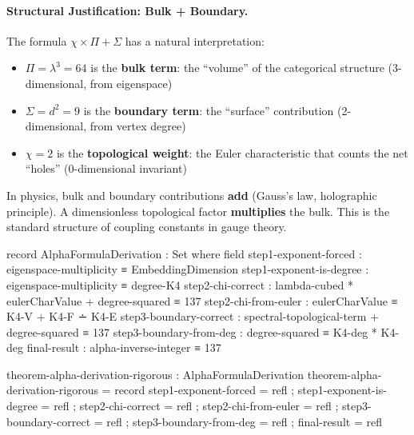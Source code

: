\documentclass[11pt,a4paper]{book}
\begin{document}

\paragraph{Structural Justification: Bulk + Boundary.}

The formula $\chi \times \Pi + \Sigma$ has a natural interpretation:

\begin{itemize}
\item $\Pi = \lambda^3 = 64$ is the \textbf{bulk term}: the ``volume'' of 
      the categorical structure (3-dimensional, from eigenspace)
\item $\Sigma = d^2 = 9$ is the \textbf{boundary term}: the ``surface'' 
      contribution (2-dimensional, from vertex degree)
\item $\chi = 2$ is the \textbf{topological weight}: the Euler characteristic 
      that counts the net ``holes'' (0-dimensional invariant)
\end{itemize}

In physics, bulk and boundary contributions \textbf{add} (Gauss's law, 
holographic principle). A dimensionless topological factor \textbf{multiplies} 
the bulk. This is the standard structure of coupling constants in gauge theory.

\begin{code}
record AlphaFormulaDerivation : Set where
  field
    step1-exponent-forced     : eigenspace-multiplicity ≡ EmbeddingDimension
    step1-exponent-is-degree  : eigenspace-multiplicity ≡ degree-K4
    step2-chi-correct         : lambda-cubed * eulerCharValue + degree-squared ≡ 137
    step2-chi-from-euler      : eulerCharValue ≡ K4-V + K4-F ∸ K4-E
    step3-boundary-correct    : spectral-topological-term + degree-squared ≡ 137
    step3-boundary-from-deg   : degree-squared ≡ K4-deg * K4-deg
    final-result              : alpha-inverse-integer ≡ 137

theorem-alpha-derivation-rigorous : AlphaFormulaDerivation
theorem-alpha-derivation-rigorous = record
  { step1-exponent-forced   = refl
  ; step1-exponent-is-degree = refl
  ; step2-chi-correct       = refl
  ; step2-chi-from-euler    = refl
  ; step3-boundary-correct  = refl
  ; step3-boundary-from-deg = refl
  ; final-result            = refl
  }
\end{code}
\end{document}
